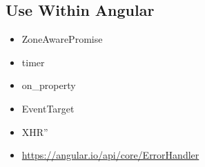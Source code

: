 \subsection{Use Within Angular}



\begin{itemize}
  \item ZoneAwarePromise
  \item timer
  \item on\_property
  \item EventTarget
  \item XHR”
\end{itemize}


\begin{itemize}
  \item \url{https://angular.io/api/core/ErrorHandler}
\end{itemize}






